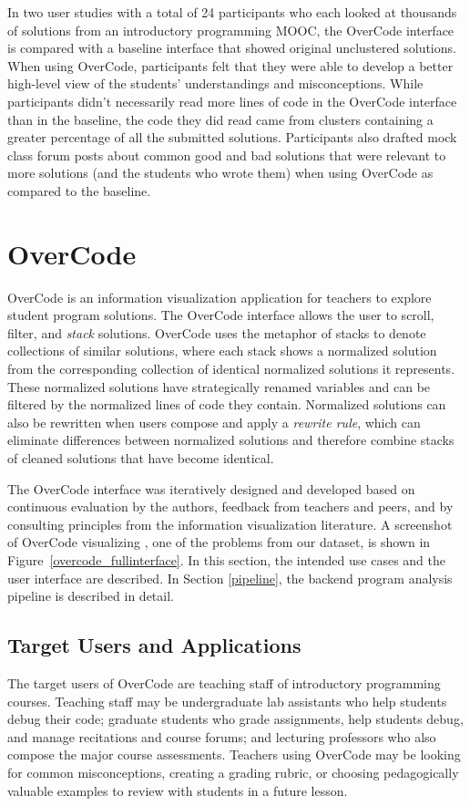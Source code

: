 In two user studies with a total of 24 participants who each looked at thousands of solutions from an introductory programming MOOC, the OverCode interface is compared with a baseline interface that showed original unclustered solutions. When using OverCode, participants felt that they were able to develop a better high-level view of the students' understandings and misconceptions. While participants didn't necessarily read more lines of code in the OverCode interface than in the baseline, the code they did read came from clusters containing a greater percentage of all the submitted solutions. Participants also drafted mock class forum posts about common good and bad solutions that were relevant to more solutions (and the students who wrote them) when using OverCode as compared to the baseline. 

\section{OverCode} \label{overcode}
OverCode is an information visualization application for teachers to explore student program solutions. The OverCode interface allows the user to scroll, filter, and \emph{stack} solutions. OverCode uses the metaphor of stacks to denote collections of similar solutions, where each stack shows a normalized solution from the corresponding collection of identical normalized solutions it represents. These normalized solutions have strategically renamed variables and can be filtered by the normalized lines of code they contain. Normalized solutions can also be rewritten when users compose and apply a \emph{rewrite rule}, which can eliminate differences between normalized solutions and therefore combine stacks of cleaned solutions that have become identical.

The OverCode interface was iteratively designed and developed based on continuous evaluation by the authors, feedback from teachers and peers, and by consulting principles from the information visualization literature. A screenshot of OverCode visualizing , one of the problems from our dataset, is shown in Figure~\ref{overcode_fullinterface}. In this section, the intended use cases and the user interface are described. In Section \ref{pipeline}, the backend program analysis pipeline is described in detail. 
\subsection{Target Users and Applications}
The target users of OverCode are teaching staff of introductory programming courses. Teaching staff may be undergraduate lab assistants who help students debug their code; graduate students who grade assignments, help students debug, and manage recitations and course forums; and lecturing professors who also compose the major course assessments. Teachers using OverCode may be looking for common misconceptions, creating a grading rubric, or choosing pedagogically valuable examples to review with students in a future lesson.


